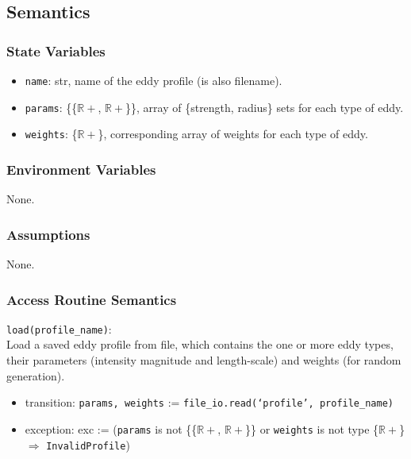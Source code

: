 \documentclass[12pt, titlepage]{article}
\begin{document}
\subsection{Semantics}

\subsubsection{State Variables}
\begin{itemize}
  \item \texttt{name}: str, name of the eddy profile (is also filename).
  \item \texttt{params}: \{{\{$\mathbb{R+}$, $\mathbb{R+}$\}}\}, array of \{strength, radius\} sets for each type of eddy.
  \item \texttt{weights}: \{$\mathbb{R+}$\}, corresponding array of weights for each type of eddy.
\end{itemize}

\subsubsection{Environment Variables}
None.

\subsubsection{Assumptions}
None.

\subsubsection{Access Routine Semantics}

\noindent \texttt{load(profile\_name)}:\\
Load a saved eddy profile from file, which contains the one or more eddy types, their parameters (intensity magnitude and length-scale) and weights (for random generation).
\begin{itemize}
\item transition: \texttt{params, weights} := \texttt{file\_io.read(`profile', profile\_name)}
\item exception: exc := (\texttt{params} is not \{{\{$\mathbb{R+}$, $\mathbb{R+}$\}}\} or \texttt{weights} is not type \{$\mathbb{R+}$\} $\Rightarrow$ \texttt{InvalidProfile})
\end{itemize}
\end{document}
